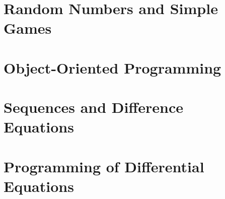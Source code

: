 \chapter{Random Numbers and Simple Games}

\chapter{Object-Oriented Programming}


\appendix
\chapter{Sequences and Difference Equations}


\addtocounter{chapter}{3}
\chapter{Programming of Differential Equations}



\printbibliography


